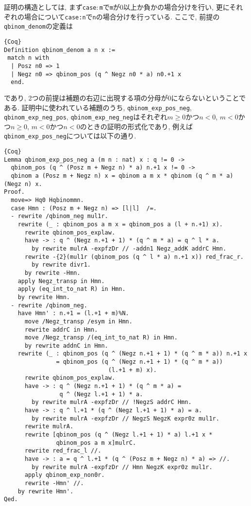 \documentclass[11pt]{jsreport}
\theoremstyle{mystyle}
\newcommand{\0}{\textbf{0}}
\begin{document}
証明の構造としては, まず{\tt case$\colon$m}で{\tt m}が$0$以上か負かの場合分けを行い, 更にそれぞれの場合について{\tt case:n}で{\tt n}の場合分けを行っている. 
ここで, 前提の{\tt qbinom\_denom}の定義は
\begin{lstlisting}{Coq}
Definition qbinom_denom a n x :=
 match n with
  | Posz n0 => 1
  | Negz n0 => qbinom_pos (q ^ Negz n0 * a) n0.+1 x
  end. \end{lstlisting}
であり, 2つの前提は補題の右辺に出現する項の分母が$0$にならないということである. 
証明中に使われている補題のうち, {\tt qbinom\_exp\_pos\_neg}, {\tt qbinom\_exp\_neg\_pos}, {\tt qbinom\_exp\_neg\_neg}はそれぞれ$m \ge 0$かつ$n < 0$, $m <0$かつ$n \ge 0$, $m < 0$かつ$n < 0$のときの証明の形式化であり, 例えば{\tt qbinom\_exp\_pos\_neg}については以下の通り. 
\begin{lstlisting}{Coq}
Lemma qbinom_exp_pos_neg a (m n : nat) x : q != 0 ->
  qbinom_pos (q ^ (Posz m + Negz n) * a) n.+1 x != 0 ->
  qbinom a (Posz m + Negz n) x = qbinom a m x * qbinom (q ^ m * a) (Negz n) x.
Proof.
  move=> Hq0 Hqbinommn.
  case Hmn : (Posz m + Negz n) => [l|l]  /=.
  - rewrite /qbinom_neg mul1r.
    rewrite (_ : qbinom_pos a m x = qbinom_pos a (l + n.+1) x).
      rewrite qbinom_pos_explaw.
      have -> : q ^ (Negz n.+1 + 1) * (q ^ m * a) = q ^ l * a.
        by rewrite mulrA -expfzDr // -addn1 Negz_addK addrC Hmn.
      rewrite -{2}(mul1r (qbinom_pos (q ^ l * a) n.+1 x)) red_frac_r.
        by rewrite divr1.
      by rewrite -Hmn.
    apply Negz_transp in Hmn.
    apply (eq_int_to_nat R) in Hmn.
    by rewrite Hmn.
  - rewrite /qbinom_neg.
    have Hmn' : n.+1 = (l.+1 + m)%N.
      move /Negz_transp /esym in Hmn.
      rewrite addrC in Hmn.
      move /Negz_transp /(eq_int_to_nat R) in Hmn.
      by rewrite addnC in Hmn.
    rewrite (_ : qbinom_pos (q ^ (Negz n.+1 + 1) * (q ^ m * a)) n.+1 x 
               = qbinom_pos (q ^ (Negz n.+1 + 1) * (q ^ m * a))
                              (l.+1 + m) x).
      rewrite qbinom_pos_explaw.
      have -> : q ^ (Negz n.+1 + 1) * (q ^ m * a) =
                q ^ (Negz l.+1 + 1) * a.
        by rewrite mulrA -expfzDr // !NegzS addrC Hmn.
      have -> : q ^ l.+1 * (q ^ (Negz l.+1 + 1) * a) = a.
        by rewrite mulrA -expfzDr // NegzS NegzK expr0z mul1r.
      rewrite mulrA.
      rewrite [qbinom_pos (q ^ (Negz l.+1 + 1) * a) l.+1 x *
               qbinom_pos a m x]mulrC.
      rewrite red_frac_l //.
      have -> : a = q ^ l.+1 * (q ^ (Posz m + Negz n) * a) => //.
        by rewrite mulrA -expfzDr // Hmn NegzK expr0z mul1r.
      apply qbinom_exp_non0r.
      rewrite -Hmn' //.
    by rewrite Hmn'.
Qed.
\end{lstlisting}
\end{document}
